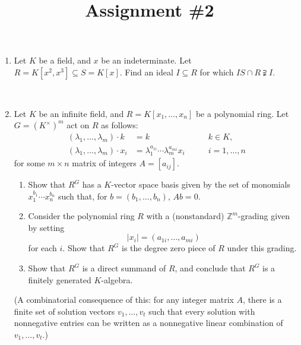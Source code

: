 \documentclass{amsart}[12pt]
\title{Assignment \#2}
\newcommand{\Z}{\mathbb{Z}}
\numberwithin{equation}{section}
\theoremstyle{plain} %
\theoremstyle{definition}
\theoremstyle{remark}
\begin{document}
\onehalfspacing

\maketitle




\begin{enumerate}


\item Let $K$ be a field, and $x$ be an indeterminate. Let $R=K[x^2,x^3] \subseteq S= K[x]$. Find an ideal $I\subseteq R$ for which $IS \cap R \supsetneqq I$.

\


\item  Let $K$ be an infinite field, and $R = K[x_1,\dots, x_n]$ be a polynomial ring. Let $G= (K^\times)^m$ act on $R$ as follows: 
\[ \begin{aligned} (\lambda_1,\dots,\lambda_m) \cdot k &= k \qquad & k\in K,\\
 (\lambda_1,\dots,\lambda_m) \cdot x_i &= \lambda_1^{a_{1i}} \cdots  \lambda_m^{a_{mi}} x_i \qquad & {i=1,\dots,n}
 \end{aligned}\]
 for some $m\times n$ matrix of integers $A=[a_{ij}]$.

\begin{enumerate} 
\item Show that $R^G$ has a $K$-vector space basis given by the set of monomials $x_1^{b_1} \cdots x_n^{b_n}$ such that, for $b=(b_1,\dots,b_n)$, $Ab=0$.
\item Consider the polynomial ring $R$ with a (nonstandard) $\Z^m$-grading given by setting \[ |x_i| = (a_{1i},\dots,a_{mi})\] for each $i$. Show that $R^G$ is the degree zero piece of $R$ under this grading.
\item Show that $R^G$ is a direct summand of $R$, and conclude that $R^G$ is a finitely generated $K$-algebra.
\end{enumerate}
(A combinatorial consequence of this: for any integer matrix $A$, there is a finite set of solution vectors $v_1,\dots,v_t$ such that every solution with nonnegative entries can be written as a nonnegative linear combination of $v_1,\dots,v_t$.)

\


\end{enumerate}
\end{document}
